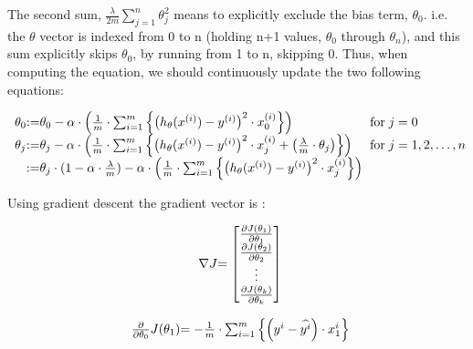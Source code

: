 The second sum, 
\( \frac{\lambda}{2m}
   \sum_{j = 1}^{n} {\theta_{j}^{2}} \)
means to explicitly exclude the bias term, $\theta_0$. i.e. the $\theta$
vector is indexed from 0 to n (holding n+1 values, $\theta_0$ through
$\theta_n$), and this sum explicitly skips $\theta_0$, by
running from 1 to n, skipping 0. Thus, when computing the equation, we should
continuously update the two following equations:

	\[
	\begin{array}{ l@{} l@{} l@{} l@{} } 
		\theta_0
		& := &
		\theta_0
		- \alpha
		\cdot
		\left(
		\frac{1}{m}
		\cdot 
			\sum_{i=1}^m
			\left\{
				\left(
					h_\theta(x^{(i)}) - y^{(i)}
				\right)^{2}
				\cdot
				x_{0}^{(i)}
			\right\}
		\right) 
		\hspace{0.5cm} & \text{for} \; j = 0 
		\\ 
		\theta_j
		& := &
		\theta_j
		- \alpha
		\cdot
		\left(
		\frac{1}{m}
		\cdot 
			\sum_{i=1}^m
			\left\{
				\left(
					h_\theta(x^{(i)}) - y^{(i)}
				\right)^{2}
				\cdot
				x_{j}^{(i)}
				+
				\left(
					\frac{\lambda}{m}\cdot \theta_j
				\right)
			\right\}
		\right) 
		\hspace{0.5cm} & \text{for} \; j = 1,2, \ldots , n 
		\\ 
		& :=
		& \theta_j
		\cdot
		(1 - \alpha \cdot \frac{\lambda}{m})
		-
		\alpha
		\cdot
		\left(
		\frac{1}{m}
		\cdot 
			\sum_{i=1}^m
			\left\{
				\left(
					h_\theta(x^{(i)}) - y^{(i)}
				\right)^{2}
				\cdot
				x_{j}^{(i)} 
			\right\}
		\right) 
		\\ 
		\end{array}
	\]

Using gradient descent the gradient vector is :

\[
	\begin{array}{ l@{} l@{} } 
		\nabla J
		& = 
		\begin{bmatrix} 
			\frac{\partial J(\theta_1)}{\partial \theta_1}  \\ 
			\frac{\partial J(\theta_2)}{\partial \theta_2}  \\ 
			\vdots \\ 
			\frac{\partial J(\theta_k)}{\partial \theta_k}  \\ 
		\end{bmatrix} 
	\end{array}
\]

\[
	\begin{array}{ l@{} l@{} } 
		\frac{\partial}{\partial \theta_0} J(\theta_1)
		& =
		-
		\frac{1}{m}
		\cdot 
		\sum_{i=1}^m
		\left\{
			\left(
				y^{i} - \widehat{y^{i}}
			\right)
			\cdot
			x_{1}^{i}
		\right\} 
	\end{array}
\]


